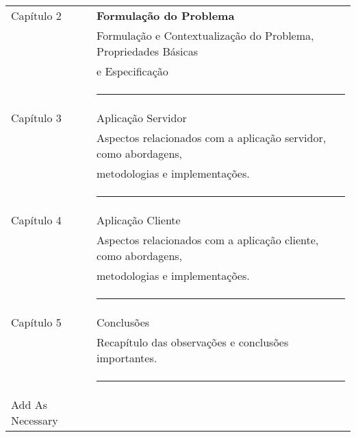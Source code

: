 \begin{tabular}{ll}
		Capítulo 2 & {\bf Formulação do Problema} \\
				   & Formulação e Contextualização do Problema, Propriedades Básicas \\
				   & e Especificação\\
				   &\rule{75mm}{0.5pt}\\
		Capítulo 3 & Aplicação Servidor \\
				   & Aspectos relacionados com a aplicação servidor, como abordagens, \\
				   & metodologias e implementações.\\
				   &\rule{75mm}{0.5pt}\\
		Capítulo 4 & Aplicação Cliente \\
				   & Aspectos relacionados com a aplicação cliente, como abordagens, \\
				   &metodologias e implementações.\\
				   &\rule{75mm}{0.5pt}\\
		Capítulo 5 & Conclusões \\
				   & Recapítulo das observações e conclusões importantes.\\
				   &\rule{75mm}{0.5pt}\\
		Add As Necessary\\[50mm]
\end{tabular}\\[10mm]